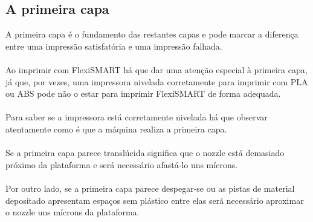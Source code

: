 \documentclass[11pt,a4paper]{article}
\begin{document}
	\subsection{A primeira capa}
A primeira capa é o fundamento das restantes capas e pode marcar a diferença entre uma impressão satisfatória e uma impressão falhada.
\\\\
Ao imprimir com FlexiSMART há que dar uma atenção especial à primeira capa, já que, por vezes, uma impressora nivelada corretamente para imprimir com PLA ou ABS pode não o estar para imprimir FlexiSMART de forma adequada.
\\\\
Para saber se a impressora está corretamente nivelada há que observar atentamente como é que a máquina realiza a primeira capa.
\\\\
Se a primeira capa parece translúcida significa que o nozzle está demasiado próximo da plataforma e será necessário afastá-lo uns mícrons.
\\\\
Por outro lado, se a primeira capa parece despegar-se ou as pistas de material depositado apresentam espaços sem plástico entre elas será necessário aproximar o nozzle uns mícrons da plataforma.
\end{document}
